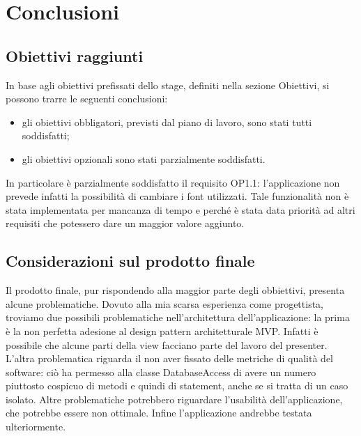 \documentclass[../Tesi.tex]{subfiles}
\begin{document}
\section{Conclusioni}
	\subsection{Obiettivi raggiunti}
	In base agli obiettivi prefissati dello stage, definiti nella sezione Obiettivi, si possono trarre le seguenti conclusioni:
	\begin{itemize}
		\item gli obiettivi obbligatori, previsti dal piano di lavoro, sono stati tutti soddisfatti;
		\item gli obiettivi opzionali sono stati parzialmente soddisfatti.
	\end{itemize}
	In particolare è parzialmente soddisfatto il requisito OP1.1: l'applicazione non prevede infatti la possibilità di cambiare i font utilizzati. Tale funzionalità non è stata implementata per mancanza di tempo e perché è stata data priorità ad altri requisiti che potessero dare un maggior valore aggiunto.

	\subsection{Considerazioni sul prodotto finale}
	Il prodotto finale, pur rispondendo alla maggior parte degli obbiettivi, presenta alcune problematiche. Dovuto alla mia scarsa esperienza come progettista, troviamo due possibili problematiche nell'architettura dell'applicazione: la prima è la non perfetta adesione al design pattern architetturale MVP. Infatti è possibile che alcune parti della view facciano parte del lavoro del presenter. L'altra problematica riguarda il non aver fissato delle metriche di qualità del software: ciò ha permesso alla classe DatabaseAccess di avere un numero piuttosto cospicuo di metodi e quindi di statement, anche se si tratta di un caso isolato. Altre problematiche potrebbero riguardare l'usabilità dell'applicazione, che potrebbe essere non ottimale. Infine l'applicazione andrebbe testata ulteriormente.
\end{document}
